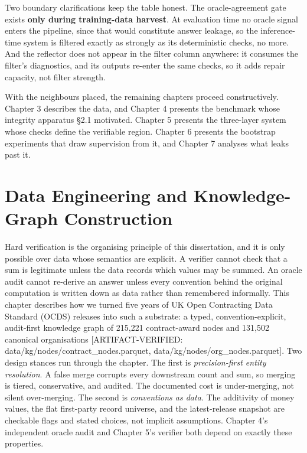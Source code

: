 \documentclass[10pt]{article} %
\begin{document}
Two boundary clarifications keep the table honest. The oracle-agreement gate exists \textbf{only during training-data harvest}. At evaluation time no oracle signal enters the pipeline, since that would constitute answer leakage, so the inference-time system is filtered exactly as strongly as its deterministic checks, no more. And the reflector does not appear in the filter column anywhere: it consumes the filter's diagnostics, and its outputs re-enter the same checks, so it adds repair capacity, not filter strength.

With the neighbours placed, the remaining chapters proceed constructively. Chapter 3 describes the data, and Chapter 4 presents the benchmark whose integrity apparatus \S2.1 motivated. Chapter 5 presents the three-layer system whose checks define the verifiable region. Chapter 6 presents the bootstrap experiments that draw supervision from it, and Chapter 7 analyses what leaks past it.

\section{Data Engineering and Knowledge-Graph Construction}\label{sec:chapter-3-data-engineering-and-knowledge}

Hard verification is the organising principle of this dissertation, and it is only possible over data whose semantics are explicit. A verifier cannot check that a sum is legitimate unless the data records which values may be summed. An oracle audit cannot re-derive an answer unless every convention behind the original computation is written down as data rather than remembered informally. This chapter describes how we turned five years of UK Open Contracting Data Standard (OCDS) releases into such a substrate: a typed, convention-explicit, audit-first knowledge graph of 215,221 contract-award nodes and 131,502 canonical organisations [ARTIFACT-VERIFIED: data/kg/nodes/contract\_nodes.parquet, data/kg/nodes/org\_nodes.parquet]. Two design stances run through the chapter. The first is \emph{precision-first entity resolution}. A false merge corrupts every downstream count and sum, so merging is tiered, conservative, and audited. The documented cost is under-merging, not silent over-merging. The second is \emph{conventions as data}. The additivity of money values, the flat first-party record universe, and the latest-release snapshot are checkable flags and stated choices, not implicit assumptions. Chapter 4's independent oracle audit and Chapter 5's verifier both depend on exactly these properties.
\end{document}
